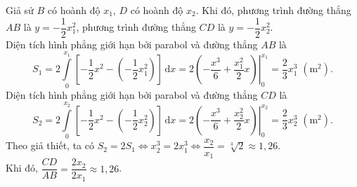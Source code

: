 \begin{ex}
{{}
	Giả sử $B$ có hoành độ $x_1$,  $D$ có hoành độ $x_2$. Khi đó, phương trình đường thẳng $AB$ là $y=-\dfrac{1}{2} x_1^2$, phương trình đường thẳng $CD$ là $y=-\dfrac{1}{2} x_2^2$.\\
	Diện tích hình phẳng giới hạn bởi parabol và đường thẳng $AB$ là
	\[
		S_1=2\displaystyle\int\limits_0^{x_1}\left[-\dfrac 12x^2-\left(-\dfrac 12x_1^2\right)\right]\mathrm{\,d} x=\left.2\left(-\dfrac{x^3}6+\dfrac{x_1^2}2x\right)\right|_0^{x_1}=\dfrac 23x_1^3\,\,\left(\mathrm{m}^2\right).
	\]
	Diện tích hình phẳng giới hạn bởi parabol và đường thẳng $CD$ là
	\[
		S_2=2\displaystyle\int\limits_0^{x_2}\left[-\dfrac 12x^2-\left(-\dfrac 12x_2^2\right)\right]\mathrm{\,d} x=\left.2\left(-\dfrac{x^3}6+\dfrac{x_2^2}2x\right)\right|_0^{x_2}=\dfrac 23x_2^3\,\,\left(\mathrm{m}^2\right).
	\]
	Theo giả thiết, ta có  $S_2=2S_1\Leftrightarrow x_2^3=2x_1^3\Leftrightarrow\dfrac{x_2}{x_1}=\sqrt[3]2\approx 1{,}26$.\\
	Khi đó, $\dfrac{CD}{AB}=\dfrac{2x_2}{2x_1}\approx 1{,}26$.
	}
\end{ex}


%
